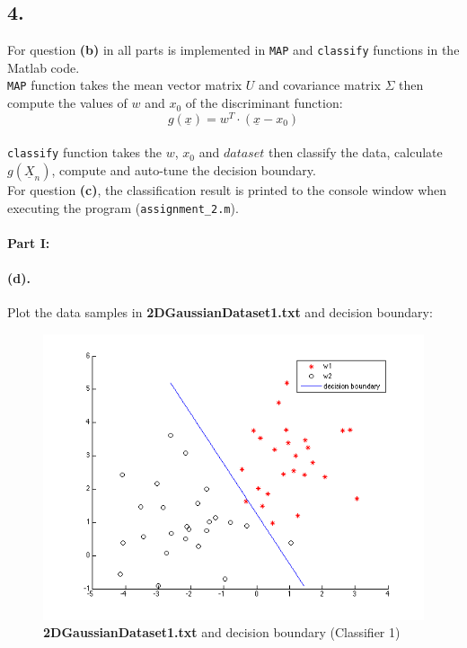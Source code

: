 \documentclass[a4paper]{article}
\begin{document}
\subsection*{4. } For question \textbf{(b)} in all parts is implemented in \texttt{MAP} and \texttt{classify} functions in the Matlab code. \\

\noindent \texttt{MAP} function takes the mean vector matrix $U$ and covariance matrix $\Sigma$ then compute the values of $w$ and $x_{0}$ of the discriminant function: \\
\begin{equation}
g(\underline{x}) = w^{T} \cdot (\underline{x} - x_{0})
\end{equation} \\

\noindent \texttt{classify} function takes the $w$, $x_{0}$ and $dataset$ then classify the data, calculate $g(\underline{X}_{n})$, compute and auto-tune the decision boundary. \\ 

\noindent For question \textbf{(c)}, the classification result is printed to the console window when executing the program (\texttt{assignment\_2.m}). \\

\paragraph{Part I:}
\paragraph{(d).} Plot the data samples in \textbf{2DGaussianDataset1.txt} and decision boundary: \\
\begin{figure}[H]
  \centering
    \includegraphics[scale=.6]{images/1_d.png}
  \caption{\textbf{2DGaussianDataset1.txt} and decision boundary (Classifier 1)}
\end{figure}
\end{document}
